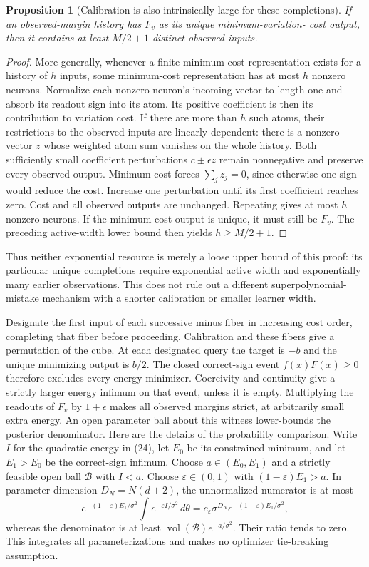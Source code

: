 \documentclass[11pt]{article}
\newtheorem{proposition}[theorem]{Proposition}
\begin{document}
\begin{proposition}[Calibration is also intrinsically large for these completions]
If an observed-margin history has $F_v$ as its unique minimum-variation-
cost output, then it contains at least $M/2+1$ distinct observed inputs.
\end{proposition}
\begin{proof}
More generally, whenever a finite minimum-cost representation exists
for a history of $h$ inputs, some minimum-cost representation has at
most $h$ nonzero neurons. Normalize each nonzero neuron's incoming
vector to length one and absorb its readout sign into its atom.
Its positive coefficient is then its contribution to variation cost.
If there are more than $h$ such atoms, their restrictions to the
observed inputs are linearly dependent: there is a nonzero vector $z$
whose weighted atom sum vanishes on the whole history.
Both sufficiently small coefficient perturbations $c\pm\epsilon z$
remain nonnegative and preserve every observed output. Minimum cost
forces $\sum_jz_j=0$, since otherwise one sign would reduce the cost.
Increase one perturbation until its first coefficient reaches zero.
Cost and all observed outputs are unchanged. Repeating gives at most
$h$ nonzero neurons. If the minimum-cost output is unique, it must still
be $F_v$. The preceding active-width lower bound then yields
$h\ge M/2+1$.
\end{proof}
Thus neither exponential resource is merely a loose upper bound of
this proof: its particular unique completions require exponential
active width and exponentially many earlier observations. This does
not rule out a different superpolynomial-mistake mechanism with a
shorter calibration or smaller learner width.

Designate the first input of each successive minus fiber in increasing
cost order, completing that fiber before proceeding. Calibration and
these fibers give a permutation of the cube. At each designated query
the target is $-b$ and the unique minimizing output is $b/2$.
The closed correct-sign event $f(x)F(x)\ge0$ therefore excludes every
energy minimizer. Coercivity and continuity give a strictly larger
energy infimum on that event, unless it is empty.
Multiplying the readouts of $F_v$ by $1+\epsilon$ makes all observed
margins strict, at arbitrarily small extra energy. An open parameter
ball about this witness lower-bounds the posterior denominator.
Here are the details of the probability comparison. Write $I$ for the
quadratic energy in (24), let $E_0$ be its constrained minimum, and let
$E_1>E_0$ be the correct-sign infimum. Choose $a\in(E_0,E_1)$ and a
strictly feasible open ball $\mathcal B$ with $I<a$.
Choose $\varepsilon\in(0,1)$ with $(1-\varepsilon)E_1>a$.
In parameter dimension $D_N=N(d+2)$, the unnormalized numerator is at most
\[
 e^{-(1-\varepsilon)E_1/\sigma^2}
        \int e^{-\varepsilon I/\sigma^2}\,d\theta
       =c_\varepsilon\sigma^{D_N}
                          e^{-(1-\varepsilon)E_1/\sigma^2},
\]
whereas the denominator is at least
$\operatorname{vol}(\mathcal B)e^{-a/\sigma^2}$.
Their ratio tends to zero. This integrates all parameterizations and
makes no optimizer tie-breaking assumption.
\end{document}
